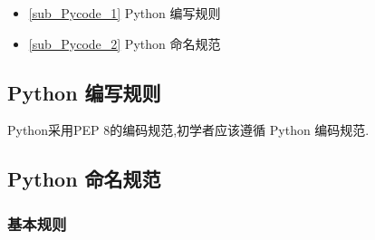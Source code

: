 
\begin{itemize}
\item \autoref{sub_Pycode_1} Python 编写规则
\item \autoref{sub_Pycode_2} Python 命名规范
\end{itemize}

\subsection{Python 编写规则}\label{sub_Pycode_1}

Python采用PEP 8的编码规范,初学者应该遵循 Python 编码规范.

\subsection{Python 命名规范}\label{sub_Pycode_2}
\subsubsection{基本规则}


